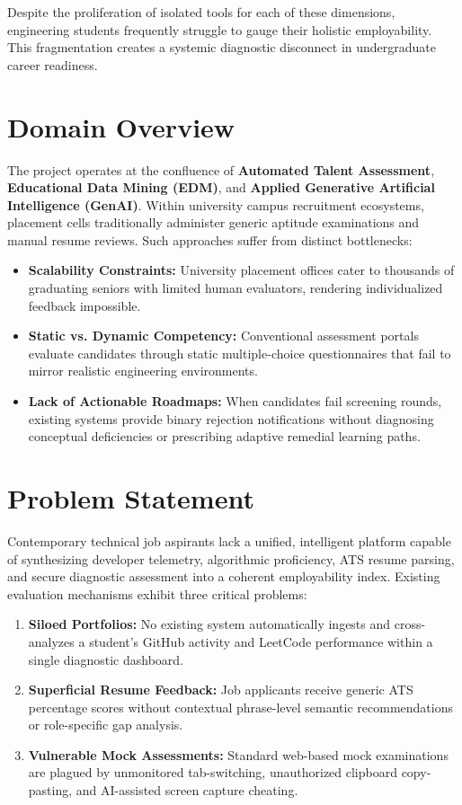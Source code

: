\documentclass[12pt,a4paper]{report}
\begin{document}
Despite the proliferation of isolated tools for each of these dimensions, engineering students frequently struggle to gauge their holistic employability. This fragmentation creates a systemic diagnostic disconnect in undergraduate career readiness.

\section{Domain Overview}
The project operates at the confluence of \textbf{Automated Talent Assessment}, \textbf{Educational Data Mining (EDM)}, and \textbf{Applied Generative Artificial Intelligence (GenAI)}. Within university campus recruitment ecosystems, placement cells traditionally administer generic aptitude examinations and manual resume reviews. Such approaches suffer from distinct bottlenecks:
\begin{itemize}
    \item \textbf{Scalability Constraints:} University placement offices cater to thousands of graduating seniors with limited human evaluators, rendering individualized feedback impossible.
    \item \textbf{Static vs. Dynamic Competency:} Conventional assessment portals evaluate candidates through static multiple-choice questionnaires that fail to mirror realistic engineering environments.
    \item \textbf{Lack of Actionable Roadmaps:} When candidates fail screening rounds, existing systems provide binary rejection notifications without diagnosing conceptual deficiencies or prescribing adaptive remedial learning paths.
\end{itemize}

\section{Problem Statement}
Contemporary technical job aspirants lack a unified, intelligent platform capable of synthesizing developer telemetry, algorithmic proficiency, ATS resume parsing, and secure diagnostic assessment into a coherent employability index. Existing evaluation mechanisms exhibit three critical problems:
\begin{enumerate}
    \item \textbf{Siloed Portfolios:} No existing system automatically ingests and cross-analyzes a student's GitHub activity and LeetCode performance within a single diagnostic dashboard.
    \item \textbf{Superficial Resume Feedback:} Job applicants receive generic ATS percentage scores without contextual phrase-level semantic recommendations or role-specific gap analysis.
    \item \textbf{Vulnerable Mock Assessments:} Standard web-based mock examinations are plagued by unmonitored tab-switching, unauthorized clipboard copy-pasting, and AI-assisted screen capture cheating.
\end{enumerate}
\end{document}
